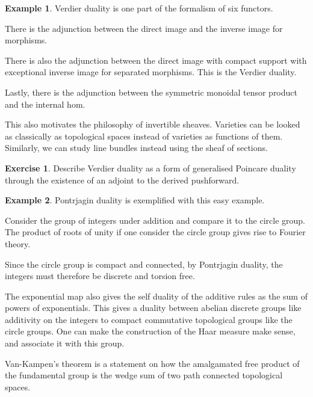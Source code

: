 \documentclass[10pt]{article}
\theoremstyle{plain}%
\theoremstyle{definition}
\newtheorem{example}{Example}[section]
\newtheorem{exercise}{Exercise}[section]
\theoremstyle{remark}
\begin{document}
\begin{example}
	Verdier duality is one part of the formalism of six functors.

	There is the adjunction between the direct image and the inverse image for morphisms.

	There is also the adjunction between the direct image with compact support with exceptional inverse image for separated morphisms. This is the Verdier duality.

	Lastly, there is the adjunction between the symmetric monoidal tensor product and the internal hom.

	This also motivates the philosophy of invertible sheaves. Varieties can be looked as classically as topological spaces instead of varieties as functions of them. Similarly, we can study line bundles instead using the sheaf of sections.
\end{example}

\begin{exercise}
	Describe Verdier duality as a form of generalised Poincare duality through the existence of an adjoint to the derived pushforward.
\end{exercise}

\begin{example}
	Pontrjagin duality is exemplified with this easy example.

	Consider the group of integers under addition and compare it to the circle group. The product of roots of unity if one consider the circle group gives rise to Fourier theory.

	Since the circle group is compact and connected, by Pontrjagin duality, the integers must therefore be discrete and torsion free.

	The exponential map also gives the self duality of the additive rules as the sum of powers of exponentials. This gives a duality between abelian discrete groups like additivity on the integers to compact commutative topological groups like the circle groups. One can make the construction of the Haar measure make sense, and associate it with this group.

	Van-Kampen's theorem is a statement on how the amalgamated free product of the fundamental group is the wedge sum of two path connected topological spaces.
\end{example}
\end{document}
